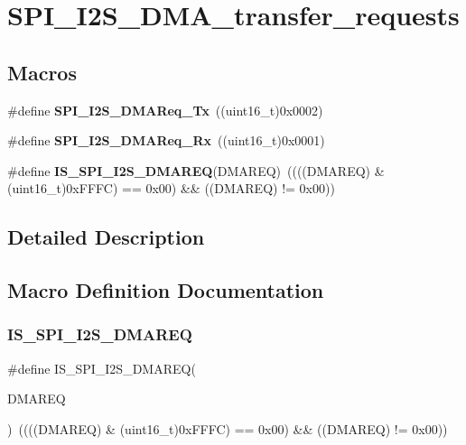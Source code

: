 \section{S\+P\+I\+\_\+\+I2\+S\+\_\+\+D\+M\+A\+\_\+transfer\+\_\+requests}
\label{group__SPI__I2S__DMA__transfer__requests}
\subsection*{Macros}
\begin{DoxyCompactItemize}
\item 
\#define \textbf{ S\+P\+I\+\_\+\+I2\+S\+\_\+\+D\+M\+A\+Req\+\_\+\+Tx}~((uint16\+\_\+t)0x0002)
\item 
\#define \textbf{ S\+P\+I\+\_\+\+I2\+S\+\_\+\+D\+M\+A\+Req\+\_\+\+Rx}~((uint16\+\_\+t)0x0001)
\item 
\#define \textbf{ I\+S\+\_\+\+S\+P\+I\+\_\+\+I2\+S\+\_\+\+D\+M\+A\+R\+EQ}(D\+M\+A\+R\+EQ)~((((D\+M\+A\+R\+EQ) \& (uint16\+\_\+t)0x\+F\+F\+F\+C) == 0x00) \&\& ((\+D\+M\+A\+R\+E\+Q) != 0x00))
\end{DoxyCompactItemize}


\subsection{Detailed Description}


\subsection{Macro Definition Documentation}
\mbox{\label{group__SPI__I2S__DMA__transfer__requests_ga6a8f97093494f2331dbdf9295d7c2c6b}} 
\subsubsection{I\+S\+\_\+\+S\+P\+I\+\_\+\+I2\+S\+\_\+\+D\+M\+A\+R\+EQ}
{\footnotesize\ttfamily \#define I\+S\+\_\+\+S\+P\+I\+\_\+\+I2\+S\+\_\+\+D\+M\+A\+R\+EQ(\begin{DoxyParamCaption}\item[{}]{D\+M\+A\+R\+EQ }\end{DoxyParamCaption})~((((D\+M\+A\+R\+EQ) \& (uint16\+\_\+t)0x\+F\+F\+F\+C) == 0x00) \&\& ((\+D\+M\+A\+R\+E\+Q) != 0x00))}



